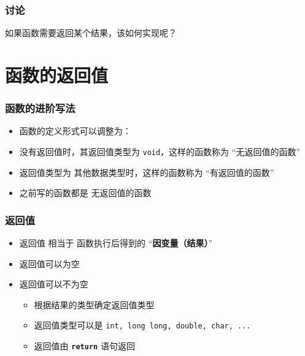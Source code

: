 \begin{frame}[fragile]
    \frametitle{讨论}

    \begin{block}{}
        \vspace{.5cm}
        \begin{center}
            {\Large 如果函数需要返回某个结果，该如何实现呢？}
        \end{center}
        \vspace{.5cm}
    \end{block}
\end{frame}

\section{函数的返回值}

\begin{frame}[fragile]
    \frametitle{函数的进阶写法}

    \begin{itemize}[<+->]
        \item 函数的定义形式可以调整为：
        
        \item 没有返回值时，其返回值类型为 \lstinline|void|，这样的函数称为 “无返回值的函数”
        \item 返回值类型为 其他数据类型时，这样的函数称为 “有返回值的函数”
        \item 之前写的函数都是 无返回值的函数
    \end{itemize}
\end{frame}

\begin{frame}[fragile]
    \frametitle{返回值}

    \begin{itemize}
        \item 返回值 相当于 函数执行后得到的 “\textbf{因变量（结果）}”
        \item 返回值可以为空
        \item 返回值可以不为空
        \begin{itemize}
            \item 根据结果的类型确定返回值类型
            \item 返回值类型可以是 \lstinline|int, long long, double, char, ...| 
            \item 返回值由 \textbf{\lstinline|return|} 语句返回
        \end{itemize}
    \end{itemize}
\end{frame}

